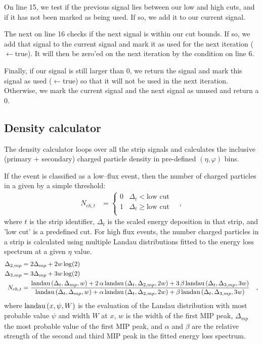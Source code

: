 \documentclass[11pt]{article}
\newcommand{\landau}[1]{{\ensuremath%
    \text{landau}\left(#1\right)}}
\begin{document}
On line 15, we test if the previous signal lies between our low and
high cuts, and if it has not been marked as being used.  If so, we add
it to our current signal.  

The next  on line 16 checks if the next signal is within our
cut bounds.  If so, we add that signal to the current signal and mark
it as used for the next iteration ($\leftarrow$true).  It will then be zero'ed on the next
iteration by the condition on line 6.

Finally, if our signal is still larger than 0, we return the signal
and mark this signal as used ($\leftarrow$true) so that it will not be used in the next
iteration. Otherwise, we mark the current signal and the next signal
as unused and return a 0. 


\subsection*{Density calculator}

The density calculator loops over all the strip signals and calculates
the inclusive (primary + secondary) charged particle density in
pre-defined $(\eta,\varphi)$ bins.  

If the event is classified as a low--flux event, then the number of
charged particles in a given by a simple threshold: 
\begin{align}
  N_{ch,t} &= \left\{
    \begin{array}{cl}
      0 & \Delta_t < \text{low cut}\\ 
      1 & \Delta_t \ge \text{low cut}\\ 
    \end{array}\right.\quad,
\end{align}
where $t$ is the strip identifier, $\Delta_t$ is the scaled energy
deposition in that strip, and 'low cut' is a predefined cut.  For high
flux events, the number charged particles in a strip is calculated
using multiple Landau distributions fitted to the energy loss spectrum
at a given $\eta$ value.  
\begin{align}
  \Delta_{2,mp} &= 2 \Delta_{mp}+ 2 w \log(2)\nonumber\\
  \Delta_{3,mp} &= 3 \Delta_{mp}+ 3 w \log(2)\nonumber\\
  N_{ch,t} &= \frac{\landau{\Delta_t,\Delta_{mp},w}+
    2\,\alpha\,\landau{\Delta_t,\Delta_{2,mp},2w} + 
    3\,\beta\,\landau{\Delta_t,\Delta_{3,mp},3w}}{%
    \landau{\Delta_t,\Delta_{mp},w}+
    \alpha\,\landau{\Delta_t,\Delta_{2,mp},2w} + 
    \beta\,\landau{\Delta_t,\Delta_{3,mp},3w}}\quad,
\end{align}
where $\landau{x,\psi,W}$ is the evaluation of the Landau distribution
with most probable value $\psi$ and width $W$ at $x$, $w$ is the width
of the first MIP peak, $\Delta_{mp}$ the most probable value of
the first MIP peak, and $\alpha$ and
$\beta$ are the relative strength of the second and third MIP peak in
the fitted energy loss spectrum. 
\end{document}
